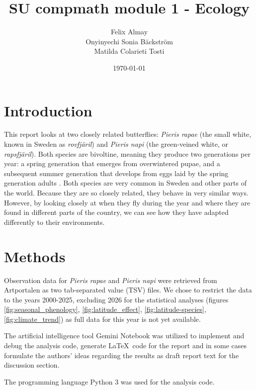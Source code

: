 \documentclass{article}
\title{SU compmath module 1 - Ecology}
\author{Felix Almay\\
Onyinyechi Sonia Bäckström\\
Matilda Colarieti Tosti}
\date{\today}
\begin{document}
\maketitle
\newpage

\section{Introduction}

This report looks at two closely related butterflies: \textit{Pieris rapae} (the small white, known in Sweden as \textit{rovfjäril}) and \textit{Pieris napi} (the green-veined white, or \textit{rapsfjäril}). Both species are bivoltine, meaning they produce two generations per year: a spring generation that emerges from overwintered pupae, and a subsequent summer generation that develops from eggs laid by the spring generation adults \cite{british_lepidoptera_rapae} \cite{british_lepidoptera_napi}. Both species are very common in Sweden and other parts of the world. Because they are so closely related, they behave in very similar ways. However, by looking closely at when they fly during the year and where they are found in different parts of the country, we can see how they have adapted differently to their environments.

\section{Methods}

Observation data for \textit{Pieris rapae} and \textit{Pieris napi} were retrieved from Artportalen \cite{artportalen} as two tab-separated value (TSV) files. We chose to restrict the data to the years 2000-2025, excluding 2026 for the statistical analyses (figures \ref{fig:seasonal_phenology}, \ref{fig:latitude_effect}, \ref{fig:latitude-species},\ref{fig:climate_trend}) as full data for this year is not yet available. 


The artificial intelligence tool Gemini Notebook \cite{gemini_notebook} was utilized to implement and debug the analysis code, generate \LaTeX~code for the report and in some cases formulate the authors' ideas regarding the results as draft report text for the discussion section.

The programming language Python 3 \cite{python3} was used for the analysis code. 
\end{document}
